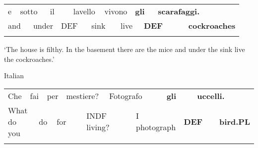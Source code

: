 \begin{tabular}{llllllllllllll}
\lsptoprule
e & \multicolumn{2}{l}{sotto

} & \multicolumn{2}{l}{il

} & \multicolumn{2}{l}{lavello

} & \multicolumn{2}{l}{vivono

} & \multicolumn{2}{l}{{\bfseries gli}

} & \multicolumn{2}{l}{{\bfseries scarafaggi.}

} & \\
\multicolumn{2}{l}{and

} & \multicolumn{2}{l}{under

} & \multicolumn{2}{l}{DEF

} & \multicolumn{2}{l}{sink

} & \multicolumn{2}{l}{live

} & \multicolumn{2}{l}{{\bfseries DEF}

} & \multicolumn{2}{l}{{\bfseries cockroaches}

}\\
\lspbottomrule
\end{tabular}

\begin{styleTranslation}
‘The house is filthy. In the basement there are the mice and under the sink live the cockroaches.’  

\end{styleTranslation}

\begin{listWWNumileveli}
\item {}

\begin{styleExample}
Italian

\end{styleExample}

\end{listWWNumileveli}

\begin{tabular}{llllllllllllll}
\lsptoprule
Che & \multicolumn{2}{l}{fai

} & \multicolumn{2}{l}{per

} & \multicolumn{2}{l}{mestiere?

} & \multicolumn{2}{l}{Fotografo

} & \multicolumn{2}{l}{{\bfseries gli}

} & \multicolumn{2}{l}{{\bfseries uccelli.}

} & \\
\multicolumn{2}{l}{What do you

} & \multicolumn{2}{l}{do

} & \multicolumn{2}{l}{for

} & \multicolumn{2}{l}{INDF living?

} & \multicolumn{2}{l}{I photograph

} & \multicolumn{2}{l}{{\bfseries DEF}

} & \multicolumn{2}{l}{{\bfseries bird.PL}

}\\
\lspbottomrule
\end{tabular}

